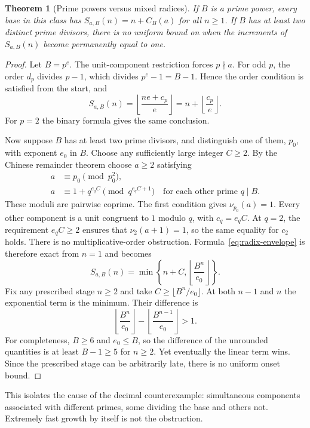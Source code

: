 \documentclass[11pt,a4paper]{article}
\newtheorem{theorem}{Theorem}[section]
\theoremstyle{definition}
\begin{document}
\begin{theorem}[Prime powers versus mixed radices]\label{thm:radix-dichotomy}
If $B$ is a prime power, every base in this class has
$S_{a,B}(n)=n+C_B(a)$ for all $n\ge1$.
If $B$ has at least two distinct prime divisors, there is no uniform bound
on when the increments of $S_{a,B}(n)$ become permanently equal to one.
\end{theorem}
\begin{proof}
Let $B=p^e$. The unit-component restriction forces $p\nmid a$.
For odd $p$, the order $d_p$ divides $p-1$, which divides $p^e-1=B-1$.
Hence the order condition is satisfied from the start, and
\[
S_{a,B}(n)=\left\lfloor\frac{ne+c_p}{e}\right\rfloor
=n+\left\lfloor\frac{c_p}{e}\right\rfloor.
\]
For $p=2$ the binary formula gives the same conclusion.

Now suppose $B$ has at least two prime divisors, and distinguish one of
them, $p_0$, with exponent $e_0$ in $B$. Choose any sufficiently large
integer $C\ge2$. By the Chinese remainder theorem choose $a\ge2$ satisfying
\begin{align*}
a&\equiv p_0\pmod{p_0^2},\\
a&\equiv1+q^{e_q C}\pmod{q^{e_q C+1}}
\quad\text{for each other prime }q\mid B.
\end{align*}
These moduli are pairwise coprime. The first condition gives
$\nu_{p_0}(a)=1$. Every other component is a unit congruent to $1$ modulo
$q$, with $c_q=e_qC$. At $q=2$, the requirement $e_qC\ge2$ ensures that
$\nu_2(a+1)=1$, so the same equality for $c_2$ holds.
There is no multiplicative-order obstruction. Formula~\eqref{eq:radix-envelope}
is therefore exact from $n=1$ and becomes
\begin{equation}\label{eq:crt-family}
S_{a,B}(n)=\min\left\{n+C,\left\lfloor\frac{B^n}{e_0}\right\rfloor\right\}.
\end{equation}
Fix any prescribed stage $n\ge2$ and take
$C\ge\lfloor B^n/e_0\rfloor$. At both $n-1$ and $n$ the exponential
term is the minimum. Their difference is
\[
\left\lfloor\frac{B^n}{e_0}\right\rfloor-
\left\lfloor\frac{B^{n-1}}{e_0}\right\rfloor>1.
\]
For completeness, $B\ge6$ and $e_0\le B$, so the difference of the
unrounded quantities is at least $B-1\ge5$ for $n\ge2$.
Yet eventually the linear term wins. Since the prescribed stage can be
arbitrarily late, there is no uniform onset bound.
\end{proof}

This isolates the cause of the decimal counterexample: simultaneous
components associated with different primes, some dividing the base and
others not. Extremely fast growth by itself is not the obstruction.
\end{document}

